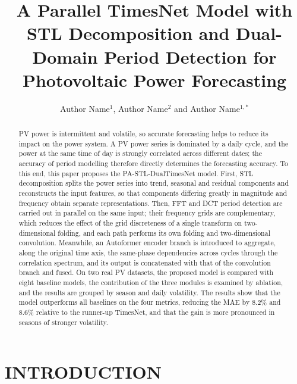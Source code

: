 \documentclass{iopjournal}
\begin{document}

\title{A Parallel TimesNet Model with STL Decomposition and Dual-Domain Period Detection for Photovoltaic Power Forecasting}

\author{Author Name$^1$, Author Name$^2$ and Author Name$^{1,*}$}




\begin{abstract}
PV power is intermittent and volatile, so accurate forecasting helps to reduce its impact on the power system. A PV power series is dominated by a daily cycle, and the power at the same time of day is strongly correlated across different dates; the accuracy of period modelling therefore directly determines the forecasting accuracy. To this end, this paper proposes the PA-STL-DualTimesNet model. First, STL decomposition splits the power series into trend, seasonal and residual components and reconstructs the input features, so that components differing greatly in magnitude and frequency obtain separate representations. Then, FFT and DCT period detection are carried out in parallel on the same input; their frequency grids are complementary, which reduces the effect of the grid discreteness of a single transform on two-dimensional folding, and each path performs its own folding and two-dimensional convolution. Meanwhile, an Autoformer encoder branch is introduced to aggregate, along the original time axis, the same-phase dependencies across cycles through the correlation spectrum, and its output is concatenated with that of the convolution branch and fused. On two real PV datasets, the proposed model is compared with eight baseline models, the contribution of the three modules is examined by ablation, and the results are grouped by season and daily volatility. The results show that the model outperforms all baselines on the four metrics, reducing the MAE by 8.2\% and 8.6\% relative to the runner-up TimesNet, and that the gain is more pronounced in seasons of stronger volatility.

\end{abstract}

\section{INTRODUCTION}
\end{document}
